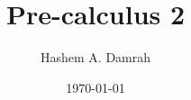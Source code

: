 \documentclass{report}
\title{Pre-calculus 2}
\author{Hashem A. Damrah}
\date{\today}
\begin{document}
  \maketitle
  \mbox{}\newpage
  
  \newpage
  
\end{document}
